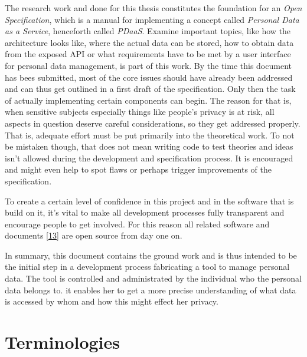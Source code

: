 \documentclass[12pt,english,a4paper,titlepage,cleardoublepage=empty,dottedtoc]{report}
\begin{document}
The research work and done for this thesis constitutes the foundation
for an \emph{Open Specification}, which is a manual for implementing a
concept called \emph{Personal Data as a Service}, henceforth called
\emph{PDaaS}. Examine important topics, like how the architecture looks
like, where the actual data can be stored, how to obtain data from the
exposed API or what requirements have to be met by a user interface for
personal data management, is part of this work. By the time this
document has bees submitted, most of the core issues should have already
been addressed and can thus get outlined in a first draft of the
specification. Only then the task of actually implementing certain
components can begin. The reason for that is, when sensitive subjects
especially things like people's privacy is at risk, all aspects in
question deserve careful considerations, so they get addressed properly.
That is, adequate effort must be put primarily into the theoretical
work. To not be mistaken though, that does not mean writing code to test
theories and ideas isn't allowed during the development and
specification process. It is encouraged and might even help to spot
flaws or perhaps trigger improvements of the specification.

To create a certain level of confidence in this project and in the
software that is build on it, it's vital to make all development
processes fully transparent and encourage people to get involved. For
this reason all related software and documents
{[}\protect\hyperlink{ref-repo_2016_pdaas-spec}{13}{]} are open source
from day one on.

In summary, this document contains the ground work and is thus intended
to be the initial step in a development process fabricating a tool to
manage personal data. The tool is controlled and administrated by the
individual who the personal data belongs to. it enables her to get a
more precise understanding of what data is accessed by whom and how this
might effect her privacy.

\hypertarget{terminologies}{\section{Terminologies}\label{terminologies}}
\end{document}
